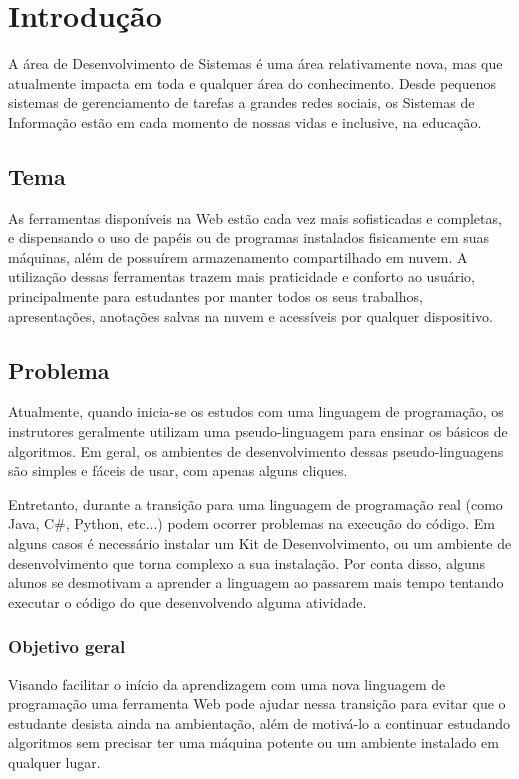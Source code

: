 \chapter{Introdução}
A área de Desenvolvimento de Sistemas é uma área relativamente nova, mas que atualmente impacta em toda e qualquer área do conhecimento. Desde pequenos sistemas de gerenciamento de tarefas a grandes redes sociais, os Sistemas de Informação estão em cada momento de nossas vidas e inclusive, na educação.

\section{Tema}
As ferramentas disponíveis na Web estão cada vez mais sofisticadas e completas, e dispensando o uso de papéis ou de programas instalados fisicamente em suas máquinas, além de possuírem armazenamento compartilhado em nuvem. A utilização dessas ferramentas trazem mais praticidade e conforto ao usuário, principalmente para estudantes por manter todos os seus trabalhos, apresentações, anotações salvas na nuvem e acessíveis por qualquer dispositivo.

\section{Problema}
Atualmente, quando inicia-se os estudos com uma linguagem de programação, os instrutores geralmente utilizam uma pseudo-linguagem para ensinar os básicos de algoritmos.
Em geral, os ambientes de desenvolvimento dessas pseudo-linguagens são simples e fáceis de usar, com apenas alguns cliques.

Entretanto, durante a transição para uma linguagem de programação real (como Java, C\#, Python, etc...) podem ocorrer problemas na execução do código. Em alguns casos é necessário instalar um Kit de Desenvolvimento, ou um ambiente de desenvolvimento que torna complexo a sua instalação. Por conta disso, alguns alunos se desmotivam a aprender a linguagem ao passarem mais tempo tentando executar o código do que desenvolvendo alguma atividade.

\subsection{Objetivo geral}
Visando facilitar o início da aprendizagem com uma nova linguagem de programação uma ferramenta Web pode ajudar nessa transição para evitar que o estudante desista ainda na ambientação, além de motivá-lo a continuar estudando algoritmos sem precisar ter uma máquina potente ou um ambiente instalado em qualquer lugar.

